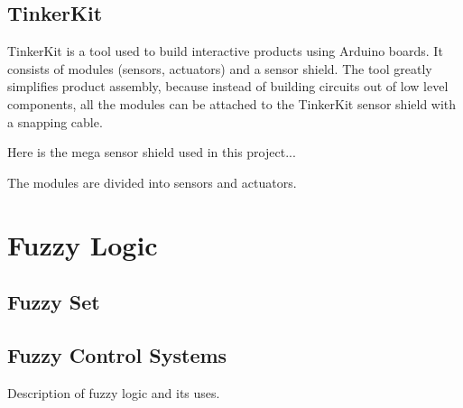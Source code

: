 
\subsection{TinkerKit}

TinkerKit \cite{tinkerkit_introduction} is a tool used to build interactive products using Arduino boards. It consists of modules (sensors, actuators) and a sensor shield. The tool greatly simplifies product assembly, because instead of building circuits out of low level components, all the modules can be attached to the TinkerKit sensor shield with a snapping cable.

Here is the mega sensor shield used in this project...

The modules are divided into sensors and actuators. 




\section{Fuzzy Logic}

\subsection{Fuzzy Set}

\subsection{Fuzzy Control Systems}

Description of fuzzy logic and its uses.





